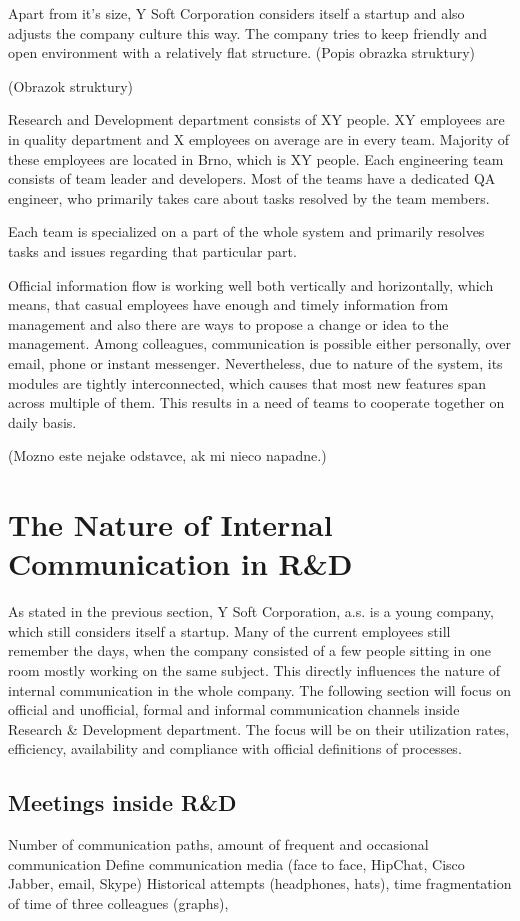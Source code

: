 \documentclass[11pt,singleside]{myfithesis2}
\begin{document}
Apart from it's size, Y Soft Corporation considers itself a startup and also adjusts the company culture this way. The company tries to keep friendly and open environment with a relatively flat structure. (Popis obrazka struktury)

(Obrazok struktury)

Research and Development department consists of XY people. XY employees are in quality department and X employees on average are in every team. Majority of these employees are located in Brno, which is XY people. Each engineering team consists of team leader and developers. Most of the teams have a dedicated QA engineer, who primarily takes care about tasks resolved by the team members.

Each team is specialized on a part of the whole system and primarily resolves tasks and issues regarding that particular part. 

Official information flow is working well both vertically and horizontally, which means, that casual employees have enough and timely information from management and also there are ways to propose a change or idea to the management. Among colleagues, communication is possible either personally, over email, phone or instant messenger. Nevertheless, due to nature of the system, its modules are tightly interconnected, which causes that most new features span across multiple of them. This results in a need of teams to cooperate together on daily basis. 

(Mozno este nejake odstavce, ak mi nieco napadne.)


	\section{The Nature of Internal Communication in R\&D}
As stated in the previous section, Y Soft Corporation, a.s. is a young company, which still considers itself a startup. Many of the current employees still remember the days, when the company consisted of a few people sitting in one room mostly working on the same subject. This directly influences the nature of internal communication in the whole company. The following section will focus on official and unofficial, formal and informal communication channels inside Research \& Development department. The focus will be on their utilization rates, efficiency, availability and compliance with official definitions of processes.

		\subsection{Meetings inside R\&D}\label{rndMeetings}
Number of communication paths, amount of frequent and occasional communication
Define communication media (face to face, HipChat, Cisco Jabber, email, Skype)
Historical attempts (headphones, hats), time fragmentation of time of three colleagues (graphs), 
		
\end{document}

